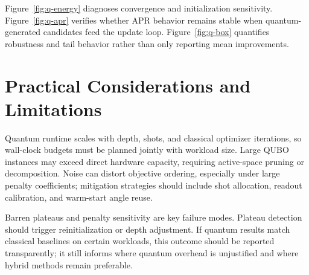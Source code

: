 \documentclass{article}
\begin{document}
Figure~\ref{fig:q-energy} diagnoses convergence and initialization sensitivity. Figure~\ref{fig:q-apr} verifies whether APR behavior remains stable when quantum-generated candidates feed the update loop. Figure~\ref{fig:q-box} quantifies robustness and tail behavior rather than only reporting mean improvements.

\section{Practical Considerations and Limitations}
Quantum runtime scales with depth, shots, and classical optimizer iterations, so wall-clock budgets must be planned jointly with workload size. Large QUBO instances may exceed direct hardware capacity, requiring active-space pruning or decomposition. Noise can distort objective ordering, especially under large penalty coefficients; mitigation strategies should include shot allocation, readout calibration, and warm-start angle reuse.

Barren plateaus and penalty sensitivity are key failure modes. Plateau detection should trigger reinitialization or depth adjustment. If quantum results match classical baselines on certain workloads, this outcome should be reported transparently; it still informs where quantum overhead is unjustified and where hybrid methods remain preferable.
\end{document}
